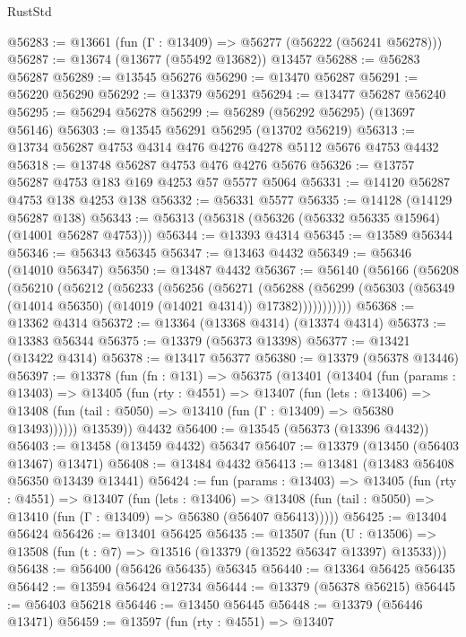 \begin{lexlean}{RustStd}
\begin{coremodule}
@56283 := @13661 (fun (Γ : @13409) => @56277 (@56222 (@56241 @56278)))
@56287 := @13674 (@13677 (@55492 @13682)) @13457
@56288 := @56283 @56287
@56289 := @13545 @56276
@56290 := @13470 @56287
@56291 := @56220 @56290
@56292 := @13379 @56291
@56294 := @13477 @56287 @56240
@56295 := @56294 @56278
@56299 := @56289 (@56292 @56295) (@13697 @56146)
@56303 := @13545 @56291 @56295 (@13702 @56219)
@56313 := @13734 @56287 @4753 @4314 @476 @4276 @4278 @5112 @5676 @4753 @4432
@56318 := @13748 @56287 @4753 @476 @4276 @5676
@56326 := @13757 @56287 @4753 @183 @169 @4253 @57 @5577 @5064
@56331 := @14120 @56287 @4753 @138 @4253 @138
@56332 := @56331 @5577
@56335 := @14128 (@14129 @56287 @138)
@56343 := @56313 (@56318 (@56326 (@56332 @56335 @15964) (@14001 @56287 @4753)))
@56344 := @13393 @4314
@56345 := @13589 @56344
@56346 := @56343 @56345
@56347 := @13463 @4432
@56349 := @56346 (@14010 @56347)
@56350 := @13487 @4432
@56367 := @56140
    (@56166
      (@56208
        (@56210
          (@56212
            (@56233
              (@56256
                (@56271
                  (@56288
                    (@56299
                      (@56303 (@56349 (@14014 @56350) (@14019 (@14021 @4314)) @17382)))))))))))
@56368 := @13362 @4314
@56372 := @13364 (@13368 @4314) (@13374 @4314)
@56373 := @13383 @56344
@56375 := @13379 (@56373 @13398)
@56377 := @13421 (@13422 @4314)
@56378 := @13417 @56377
@56380 := @13379 (@56378 @13446)
@56397 := @13378
    (fun (fn : @131) =>
    @56375
      (@13401
        (@13404
          (fun (params : @13403) =>
          @13405
            (fun (rty : @4551) =>
            @13407
              (fun (lets : @13406) =>
              @13408 (fun (tail : @5050) => @13410 (fun (Γ : @13409) => @56380 @13493))))))
        @13539))
    @4432
@56400 := @13545 (@56373 (@13396 @4432))
@56403 := @13458 (@13459 @4432) @56347
@56407 := @13379 (@13450 (@56403 @13467) @13471)
@56408 := @13484 @4432
@56413 := @13481 (@13483 @56408 @56350 @13439 @13441)
@56424 := fun (params : @13403) =>
  @13405
    (fun (rty : @4551) =>
    @13407
      (fun (lets : @13406) =>
      @13408 (fun (tail : @5050) => @13410 (fun (Γ : @13409) => @56380 (@56407 @56413)))))
@56425 := @13404 @56424
@56426 := @13401 @56425
@56435 := @13507
    (fun (U : @13506) => @13508 (fun (t : @7) => @13516 (@13379 (@13522 @56347 @13397) @13533)))
@56438 := @56400 (@56426 @56435) @56345
@56440 := @13364 @56425 @56435
@56442 := @13594 @56424 @12734
@56444 := @13379 (@56378 @56215)
@56445 := @56403 @56218
@56446 := @13450 @56445
@56448 := @13379 (@56446 @13471)
@56459 := @13597
    (fun (rty : @4551) =>
    @13407

\end{coremodule}
\end{lexlean}
